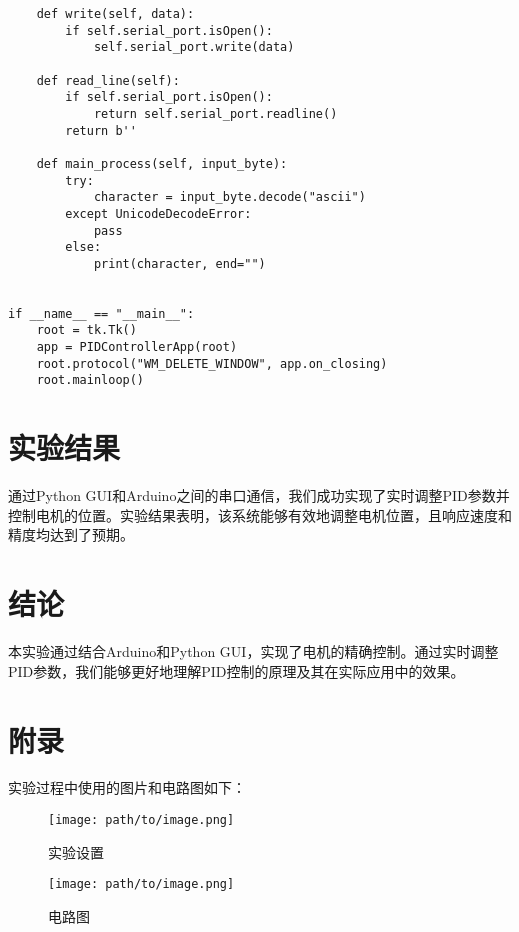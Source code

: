 \documentclass{article}
\begin{document}
\begin{verbatim}
    def write(self, data):
        if self.serial_port.isOpen():
            self.serial_port.write(data)

    def read_line(self):
        if self.serial_port.isOpen():
            return self.serial_port.readline()
        return b''

    def main_process(self, input_byte):
        try:
            character = input_byte.decode("ascii")
        except UnicodeDecodeError:
            pass
        else:
            print(character, end="")


if __name__ == "__main__":
    root = tk.Tk()
    app = PIDControllerApp(root)
    root.protocol("WM_DELETE_WINDOW", app.on_closing)
    root.mainloop()
\end{verbatim}

\section{实验结果}
通过Python GUI和Arduino之间的串口通信，我们成功实现了实时调整PID参数并控制电机的位置。实验结果表明，该系统能够有效地调整电机位置，且响应速度和精度均达到了预期。

\section{结论}
本实验通过结合Arduino和Python GUI，实现了电机的精确控制。通过实时调整PID参数，我们能够更好地理解PID控制的原理及其在实际应用中的效果。

\section{附录}
实验过程中使用的图片和电路图如下：

\begin{figure}[H]
    \centering
    \texttt{[image: path/to/image.png]}
    \caption{实验设置}
\end{figure}

\begin{figure}[H]
    \centering
    \texttt{[image: path/to/image.png]}
    \caption{电路图}
\end{figure}
\end{document}
